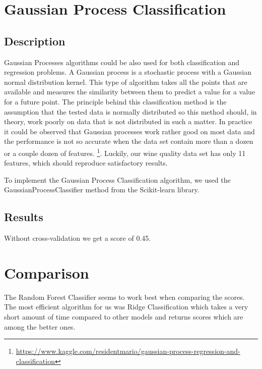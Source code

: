 \documentclass[twocolumn]{scrartcl}
\begin{document}
\section{Gaussian Process Classification}
\subsection{Description}
Gaussian Processes algorithms could be also used for both classification and regression problems. A Gaussian process is a stochastic process with a Gaussian normal distribution kernel. This type of algorithm takes all the points that are available and measures the similarity between them to predict a value for a value for a future point.
The principle behind this classification method is the assumption that the tested data is normally distributed so this method should, in theory, work poorly on data that is not distributed in such a matter. In practice it could be observed that Gaussian processes work rather good on most data and the performance is not so accurate when the data set contain more than a dozen or a couple dozen of features.
\footnote{\url{https://www.kaggle.com/residentmario/gaussian-process-regression-and-classification}}.
Luckily, our wine quality data set has only 11 features, which should reproduce satisfactory results.

To implement the Gaussian Process Classification algorithm, we used the GaussianProcessClassifier method from the Scikit-learn library.

\subsection{Results}

Without cross-validation we get a score of 0.45.

\section{Comparison}

The Random Forest Classifier seems to work best when comparing the scores. The most efficient algorithm for us was Ridge Classification which takes a very short amount of time compared to other models and returns scores which are among the better ones.
\end{document}
